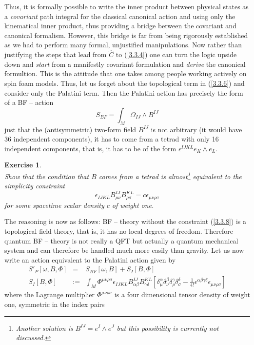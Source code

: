 \documentclass[12pt]{report}
\newtheorem{Exercise}{Exercise}[section]
\def\be{\begin{equation}}
\def\ee{\end{equation}}
\def\ba{\begin{eqnarray}}
\def\ea{\end{eqnarray}}
\begin{document}
Thus, it is formally possible to write the inner product between physical 
states as a {\it covariant} path integral for the classical canonical 
action and using only the kinematical inner product, thus providing a 
bridge between the covariant and canonical formalism. However, this 
bridge is far from being rigorously established as we had to perform
many formal, unjustified manipulations. Now rather than justifying the 
steps that lead from $\hat{C}$ to (\ref{3.3.4}) one can turn the logic 
upside down and {\it start} from a manifestly covariant formulation and 
{\it derive} the canonical formultion. This is the attitude that one 
takes among people working actively on spin foam models. Thus, let us 
forget about the topological term in (\ref{3.3.6}) and consider only the 
Palatini term. Then the Palatini action has precisely the form 
of a BF -- action
\be \label{3.3.7}
S_{BF}=\int_M \Omega_{IJ}\wedge B^{IJ}
\ee
just that the (antisymmetric) two-form field $B^{IJ}$ is not arbitrary
(it would have 36 independent components), it has to come from a 
tetrad with only 16 independent components, 
that is, it has to be of the form $\epsilon^{IJKL} e_K\wedge e_L$. 
%
\begin{Exercise} \label{ex3.3.1}  ~~~\\
Show that the condition that $B$ comes from a tetrad is 
almost\footnote{Another solution is $B^{IJ}=e^I\wedge e^J$ but 
this possibility is currently not discussed.} equivalent to the 
{\it simplicity constraint}
\be \label{3.3.8}
\epsilon_{IJKL} B^{IJ}_{\mu\nu} 
B^{KL}_{\rho\sigma}=c\epsilon_{\mu\nu\rho\sigma}
\ee
for some spacetime scalar density $c$ of weight one.
\end{Exercise}
%
The reasoning is now as follows: BF -- theory without the constraint
(\ref{3.3.8}) is a topological field theory, that is, it has no local
degrees of freedom. Therefore quantum BF -- theory is not really a QFT but
actually a quantum mechanical system and can therefore be handled 
much more easily than gravity. Let us now write an action equivalent
to the Palatini action given by
\ba \label{3.3.9}
S'_P[\omega,B,\Phi]&=&S_{BF}[\omega,B]+S_I[B,\Phi]\nonumber\\
S_I[B,\Phi] &:=& \int_M \Phi^{\mu\nu\rho\sigma}\epsilon_{IJKL}
B^{IJ}_{\alpha\beta} B^{KL}_{\gamma\delta}[
\delta^\alpha_\mu\delta^\beta_\nu\delta^\gamma_\rho\delta^\delta_\sigma
-\frac{1}{4!} 
\epsilon^{\alpha\beta\gamma\delta}\epsilon_{\mu\nu\rho\sigma}]
\ea
where the Lagrange multiplier $\Phi^{\mu\nu\rho\sigma}$ \cite{51}
is a four 
dimensional tensor density of weight one, symmetric in the index pairs 
\end{document}
